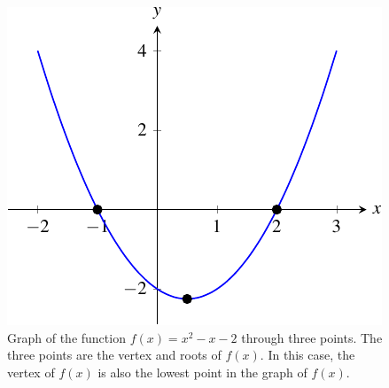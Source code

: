 \documentclass[a4paper,oneside,12pt]{article}
\begin{document}
\begin{figure}[!htbp]
\centering
\includegraphics[scale=1]{image/08/a1-bminus1-cminus2.pdf}
\caption{%
  Graph of the function $f(x) = x^2 - x - 2$ through three points.
  The three points are the vertex and roots of $f(x)$.  In this case,
  the vertex of $f(x)$ is also the lowest point in the graph of
  $f(x)$.
}
\label{fig:a1_bminus1_cminus2}
\end{figure}
\end{document}
